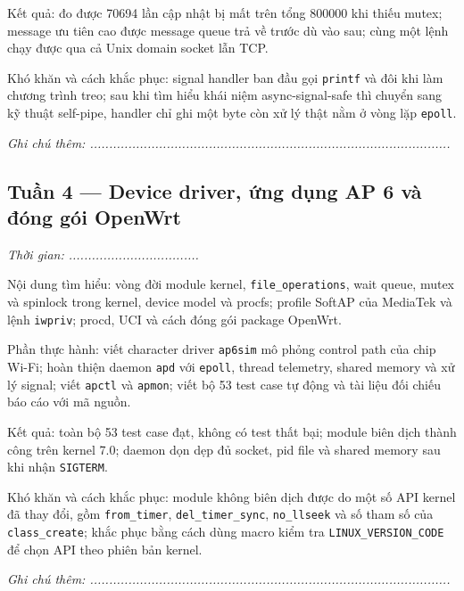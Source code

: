 \documentclass[11pt]{article}
\newcommand{\code}[1]{\texttt{#1}}
\begin{document}
Kết quả: đo được 70694 lần cập nhật bị mất trên tổng 800000 khi thiếu mutex; message ưu tiên cao được message queue trả về trước dù vào sau; cùng một lệnh chạy được qua cả Unix domain socket lẫn TCP.

Khó khăn và cách khắc phục: signal handler ban đầu gọi \code{printf} và đôi khi làm chương trình treo; sau khi tìm hiểu khái niệm async-signal-safe thì chuyển sang kỹ thuật self-pipe, handler chỉ ghi một byte còn xử lý thật nằm ở vòng lặp \code{epoll}.

\vspace{0.4cm}
\textit{Ghi chú thêm: ..............................................................................................}
\vspace{0.6cm}

\subsection*{Tuần 4 --- Device driver, ứng dụng AP 6 và đóng gói OpenWrt}

\textit{Thời gian: ..................................}

Nội dung tìm hiểu: vòng đời module kernel, \code{file\_operations}, wait queue, mutex và spinlock trong kernel, device model và procfs; profile SoftAP của MediaTek và lệnh \code{iwpriv}; procd, UCI và cách đóng gói package OpenWrt.

Phần thực hành: viết character driver \code{ap6sim} mô phỏng control path của chip Wi-Fi; hoàn thiện daemon \code{apd} với \code{epoll}, thread telemetry, shared memory và xử lý signal; viết \code{apctl} và \code{apmon}; viết bộ 53 test case tự động và tài liệu đối chiếu báo cáo với mã nguồn.

Kết quả: toàn bộ 53 test case đạt, không có test thất bại; module biên dịch thành công trên kernel 7.0; daemon dọn dẹp đủ socket, pid file và shared memory sau khi nhận \code{SIGTERM}.

Khó khăn và cách khắc phục: module không biên dịch được do một số API kernel đã thay đổi, gồm \code{from\_timer}, \code{del\_timer\_sync}, \code{no\_llseek} và số tham số của \code{class\_create}; khắc phục bằng cách dùng macro kiểm tra \code{LINUX\_VERSION\_CODE} để chọn API theo phiên bản kernel.

\vspace{0.4cm}
\textit{Ghi chú thêm: ..............................................................................................}
\vspace{0.6cm}
\end{document}
